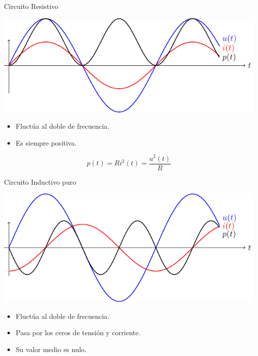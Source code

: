 \documentclass[xcolor={usenames,svgnames,dvipsnames}]{beamer}
\begin{document}
\begin{frame}[label={sec:orgd53c9fd}]{Circuito Resistivo}
\begin{center}
\includegraphics[width=.9\linewidth]{../figs/resistivoPotencia.pdf}
\end{center}

\begin{itemize}
\item Fluctúa al doble de frecuencia.
\item Es siempre positiva.
\end{itemize}
\[
  p(t) = R i^2(t) = \frac{u^2(t)}{R}
\]
\end{frame}
\begin{frame}[label={sec:org3a8027c}]{Circuito Inductivo puro}
\begin{center}
\includegraphics[width=.9\linewidth]{../figs/inductivoPuroPotencia.pdf}
\end{center}

\begin{itemize}
\item Fluctúa al doble de frecuencia.
\item Pasa por los ceros de tensión y corriente.
\item Su valor medio es nulo.
\end{itemize}
\end{frame}
\end{document}
